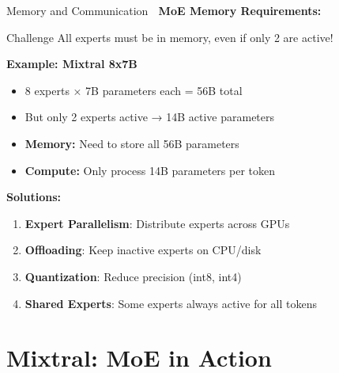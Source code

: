 \documentclass[aspectratio=169]{beamer}
\begin{document}
\begin{frame}[shrink=10]{Memory and Communication 💾}
\textbf{MoE Memory Requirements:}

\vspace{0.5em}

\begin{alertblock}{Challenge}
All experts must be in memory, even if only 2 are active!
\end{alertblock}

\vspace{0.5em}

\textbf{Example: Mixtral 8x7B}
\begin{itemize}\setlength{\itemsep}{0pt}
    \item 8 experts × 7B parameters each = 56B total
    \item But only 2 experts active → 14B active parameters
    \item \textbf{Memory:} Need to store all 56B parameters
    \item \textbf{Compute:} Only process 14B parameters per token
\end{itemize}

\vspace{0.5em}

\textbf{Solutions:}
\begin{enumerate}\setlength{\itemsep}{0pt}
    \item \textbf{Expert Parallelism}: Distribute experts across GPUs
    \item \textbf{Offloading}: Keep inactive experts on CPU/disk
    \item \textbf{Quantization}: Reduce precision (int8, int4)
    \item \textbf{Shared Experts}: Some experts always active for all tokens
\end{enumerate}
\end{frame}

\section{Mixtral: MoE in Action}
\end{document}

